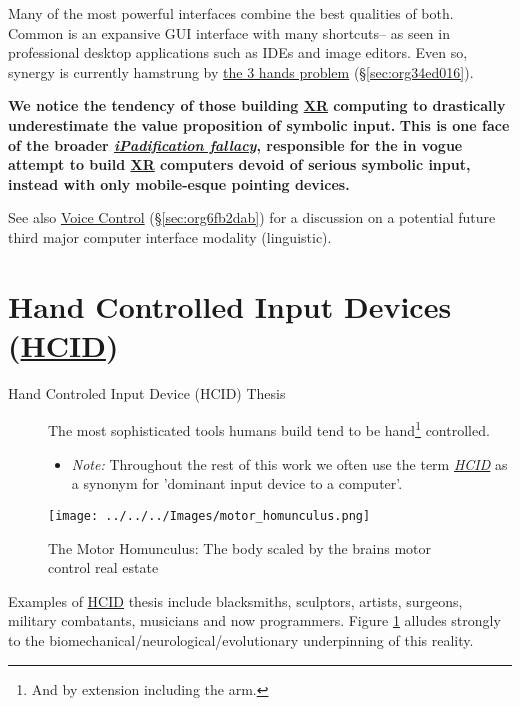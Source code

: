 \documentclass[logo,bsc,singlespacing,parskip]{infthesis}
\begin{document}
Many of the most powerful interfaces combine the best qualities of both.
Common is an expansive GUI interface with many shortcuts-- as seen in professional desktop applications such as IDEs and image editors.
Even so, synergy is currently hamstrung by \hyperref[sec:org34ed016]{the 3 hands problem} (\S \ref{sec:org34ed016}).

\textbf{We notice the tendency of those building \hyperref[org53dbe83]{XR} computing to drastically underestimate the value proposition of symbolic input.}
\textbf{This is one face of the broader \emph{\hyperref[ipadification fallacy]{iPadification fallacy}}, responsible for the in vogue attempt to build \hyperref[org53dbe83]{XR} computers devoid of serious symbolic input, instead with only mobile-esque pointing devices.}

See also \hyperref[sec:org6fb2dab]{Voice Control} (\S \ref{sec:org6fb2dab}) for a discussion on a potential future third major computer interface modality (linguistic).

\section{Hand Controlled Input Devices (\hyperref[org917851e]{HCID})}
\label{sec:org01cf194}
\begin{mdframed}
\begin{description}
\item[{Hand Controled Input Device (\label{org917851e}HCID) Thesis}] The most sophisticated tools humans build tend to be hand\footnote{And by extension including the arm.} controlled.
\begin{itemize}
\item \emph{Note:} Throughout the rest of this work we often use the term \emph{\hyperref[org917851e]{HCID}} as a synonym for 'dominant input device to a computer'.
\end{itemize}
\end{description}
\end{mdframed}

\begin{figure}[h]
\centering
\texttt{[image: ../../../Images/motor\_homunculus.png]}
\caption{\label{fig:motohomo}The Motor Homunculus: The body scaled by the brains motor control real estate}
\end{figure}

Examples of \hyperref[org917851e]{HCID} thesis include blacksmiths, sculptors, artists, surgeons, military combatants, musicians and now programmers.
Figure \ref{fig:motohomo} alludes strongly to the biomechanical/neurological/evolutionary underpinning of this reality.
\end{document}
